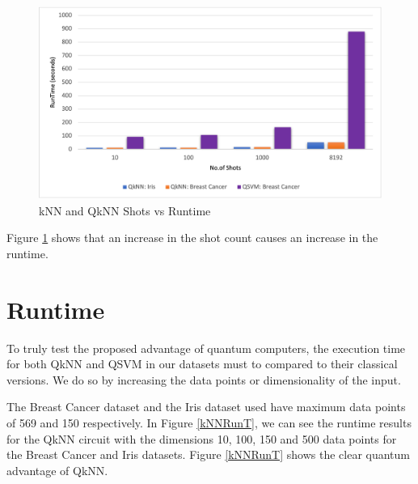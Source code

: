 \begin{figure}[H]
      \centering
      \includegraphics[scale=0.7]{background/shotsVsRun.png}
      \caption{kNN and QkNN Shots vs Runtime}
      \label{ShotVRun}
\end{figure}
Figure \ref{ShotVRun} shows that an increase in the shot count causes an increase in the runtime.




\section{Runtime}\label{RuntimeOut}
To truly test the proposed advantage of quantum computers, the execution time for both QkNN and QSVM in our datasets must to compared to their classical versions. We do so by increasing the data points or dimensionality of the input. 

The Breast Cancer dataset and the Iris dataset used have maximum data points of 569 and 150 respectively. In Figure \ref{kNNRunT}, we can see the runtime results for the QkNN circuit with the dimensions 10, 100, 150 and 500 data points for the Breast Cancer and Iris datasets. Figure \ref{kNNRunT} shows the clear quantum advantage of QkNN.


